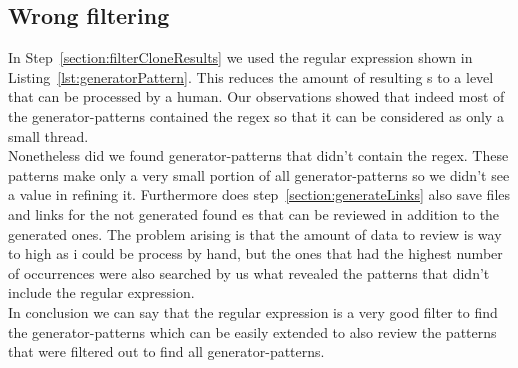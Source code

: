 \subsection{Wrong filtering}
In Step~\ref{section:filterCloneResults} we used the regular expression shown in Listing~\ref{lst:generatorPattern}. This reduces the amount of resulting s to a level that can be processed by a human. Our observations showed that indeed most of the generator-patterns contained the regex so that it can be considered as only a small thread.\\
Nonetheless did we found generator-patterns that didn't contain the regex. These patterns make only a very small portion of all generator-patterns so we didn't see a value in refining it. Furthermore does step~\ref{section:generateLinks} also save files and links for the not generated found es that can be reviewed in addition to the generated ones. The problem arising is that the amount of data to review is way to high as i could be process by hand, but the ones that had the highest number of occurrences were also searched by us what revealed the patterns that didn't include the regular expression.\\
In conclusion we can say that the regular expression is a very good filter to find the generator-patterns which can be easily extended to also review the patterns that were filtered out to find all generator-patterns.

